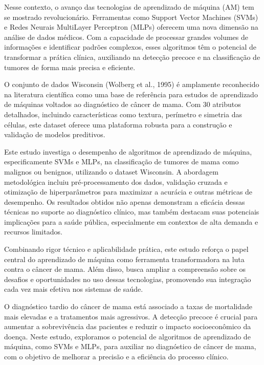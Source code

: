 \documentclass[12pt,a4paper,oneside,openany]{article}
\begin{document}
\noindent Nesse contexto, o avanço das tecnologias de aprendizado de máquina (AM) tem se mostrado revolucionário. Ferramentas como Support Vector Machines (SVMs) e Redes Neurais MultiLayer Perceptron (MLPs) oferecem uma nova dimensão na análise de dados médicos. Com a capacidade de processar grandes volumes de informações e identificar padrões complexos, esses algoritmos têm o potencial de transformar a prática clínica, auxiliando na detecção precoce e na classificação de tumores de forma mais precisa e eficiente.

\noindent O conjunto de dados Wisconsin (Wolberg et al., 1995) é amplamente reconhecido na literatura científica como uma base de referência para estudos de aprendizado de máquinas voltados ao diagnóstico de câncer de mama. Com 30 atributos detalhados, incluindo características como textura, perímetro e simetria das células, este dataset oferece uma plataforma robusta para a construção e validação de modelos preditivos.

\noindent Este estudo investiga o desempenho de algoritmos de aprendizado de máquina, especificamente SVMs e MLPs, na classificação de tumores de mama como malignos ou benignos, utilizando o dataset Wisconsin. A abordagem metodológica incluiu pré-processamento dos dados, validação cruzada e otimização de hiperparâmetros para maximizar a acurácia e outras métricas de desempenho. Os resultados obtidos não apenas demonstram a eficácia dessas técnicas no suporte ao diagnóstico clínico, mas também destacam suas potenciais implicações para a saúde pública, especialmente em contextos de alta demanda e recursos limitados.

\noindent Combinando rigor técnico e aplicabilidade prática, este estudo reforça o papel central do aprendizado de máquina como ferramenta transformadora na luta contra o câncer de mama. Além disso, busca ampliar a compreensão sobre os desafios e oportunidades no uso dessas tecnologias, promovendo sua integração cada vez mais efetiva nos sistemas de saúde.

\noindent O diagnóstico tardio do câncer de mama está associado a taxas de mortalidade mais elevadas e a tratamentos mais agressivos. A detecção precoce é crucial para aumentar a sobrevivência das pacientes e reduzir o impacto socioeconômico da doença. Neste estudo, exploramos o potencial de algoritmos de aprendizado de máquina, como SVMs e MLPs, para auxiliar no diagnóstico de câncer de mama, com o objetivo de melhorar a precisão e a eficiência do processo clínico.
\end{document}
